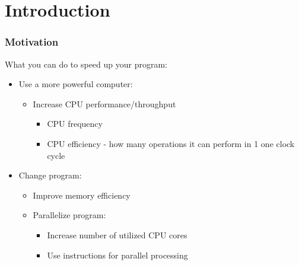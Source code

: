 \documentclass{beamer}
\subtitle{Lecture 01. Introduction}
\author{Pavel Píša \phantom{xxxxxxxxx} Petr Štěpán \\ \small\texttt{pisa@fel.cvut.cz} \phantom{xx} \small\texttt{stepan@fel.cvut.cz} \\
\phantom{xxxxxxxxx} \\
License: CC-BY-SA}
\begin{document}
\maketitle

\section{Introduction}


\begin{frame}
\frametitle{Motivation}
What you can do to speed up your program:
\begin{itemize}
\item Use a more powerful computer:
  \begin{itemize}
  \item Increase CPU performance/throughput
    \begin{itemize}
    \item CPU frequency
    \item CPU efficiency - how many operations it can perform in 1 one clock cycle
    \end{itemize}
  \end{itemize}
\item Change program:
  \begin{itemize}
  \item Improve memory efficiency
  \item Parallelize program:
    \begin{itemize}
    \item Increase number of utilized CPU cores
    \item Use instructions for parallel processing
    \end{itemize}
  \end{itemize}
\end{itemize}
\end{frame}
\end{document}
